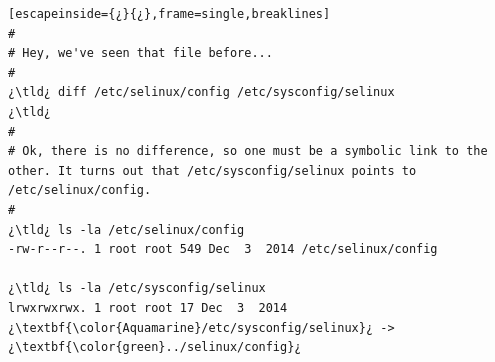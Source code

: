 \begin{lstlisting}[escapeinside={¿}{¿},frame=single,breaklines]
#
# Hey, we've seen that file before...
#
¿\tld¿ diff /etc/selinux/config /etc/sysconfig/selinux
¿\tld¿ 
#
# Ok, there is no difference, so one must be a symbolic link to the other. It turns out that /etc/sysconfig/selinux points to /etc/selinux/config.
#
¿\tld¿ ls -la /etc/selinux/config
-rw-r--r--. 1 root root 549 Dec  3  2014 /etc/selinux/config

¿\tld¿ ls -la /etc/sysconfig/selinux
lrwxrwxrwx. 1 root root 17 Dec  3  2014 ¿\textbf{\color{Aquamarine}/etc/sysconfig/selinux}¿ -> ¿\textbf{\color{green}../selinux/config}¿
\end{lstlisting}
